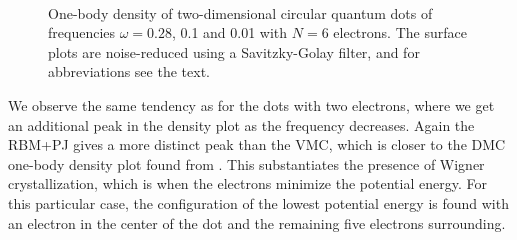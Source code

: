 \begin{figure}
	\centering
	\captionsetup[subfigure]{labelformat=empty}
	\hspace{0.1cm}
	\hspace{-0.cm}
	\hspace{-0.cm}
	\\ [-0.cm]
	
	\hspace{0.1cm}
	\hspace{-0.cm}
	\hspace{-0.cm}
	
	\caption{One-body density of two-dimensional circular quantum dots of frequencies $\omega=0.28$, 0.1 and 0.01 with $N=6$ electrons. The surface plots are noise-reduced using a Savitzky-Golay filter, and for abbreviations see the text.}
	\label{fig:lowfreq6P}
\end{figure}

We observe the same tendency as for the dots with two electrons, where we get an additional peak in the density plot as the frequency decreases. Again the RBM+PJ gives a more distinct peak than the VMC, which is closer to the DMC one-body density plot found from \citet{hogberget_quantum_2013}. This substantiates the presence of Wigner crystallization, which is when the electrons minimize the potential energy. For this particular case, the configuration of the lowest potential energy is found with an electron in the center of the dot and the remaining five electrons surrounding. 

